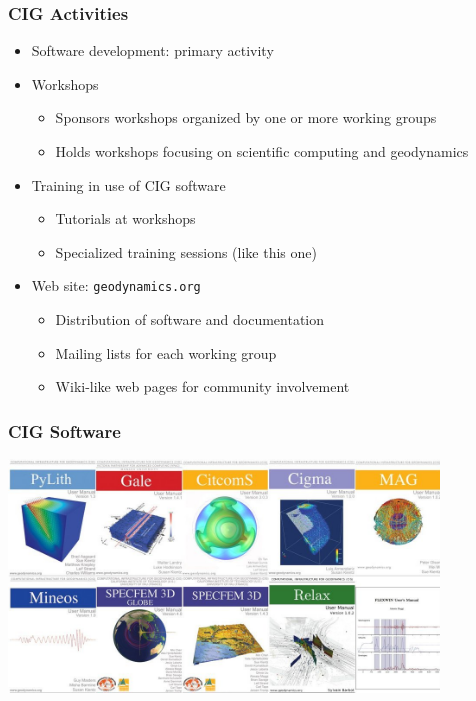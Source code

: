 \documentclass{beamer}
\begin{document}
\begin{frame}
  \frametitle{CIG Activities}
  \summary{}

  \begin{itemize}
  \item Software development: primary activity
  \item Workshops
    \begin{itemize}
    \item Sponsors workshops organized by one or more working groups
    \item Holds workshops focusing on scientific computing and geodynamics
    \end{itemize}
  \item Training in use of CIG software
    \begin{itemize}
    \item Tutorials at workshops
    \item Specialized training sessions (like this one)
    \end{itemize}
  \item Web site: {\tt geodynamics.org}
    \begin{itemize}
    \item Distribution of software and documentation
    \item Mailing lists for each working group
    \item Wiki-like web pages for community involvement
    \end{itemize}
  \end{itemize}
 
\end{frame}


\begin{frame}
  \frametitle{CIG Software}
  \summary{}

  \vfill
  \begin{center}
    \includegraphics[width=4.5in]{figs/covers}
  \end{center}
  \vfill

\end{frame}
\end{document}
